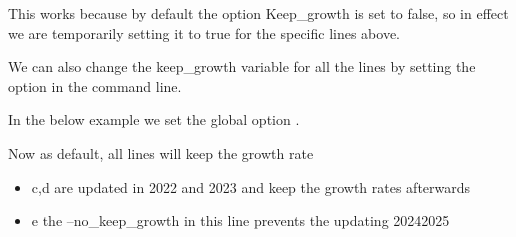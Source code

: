\documentclass[letterpaper,10pt,english]{jupyterBook}
\begin{document}
\sphinxAtStartPar
This works because by default the option Keep\_growth is set to false, so in effect we are temporarily setting it to true for the specific lines above.

\sphinxAtStartPar
We can also change the keep\_growth variable for all the lines by setting the option in the command line.

\sphinxAtStartPar
In the below example we set the global option .

\sphinxAtStartPar
Now as default, all lines will keep the growth rate
\begin{itemize}
\item {} 
\sphinxAtStartPar
c,d are updated in 2022 and 2023 and keep the growth rates afterwards

\item {} 
\sphinxAtStartPar
e the –no\_keep\_growth in this line prevents the updating 2024\sphinxhyphen{}2025

\end{itemize}
\end{document}
